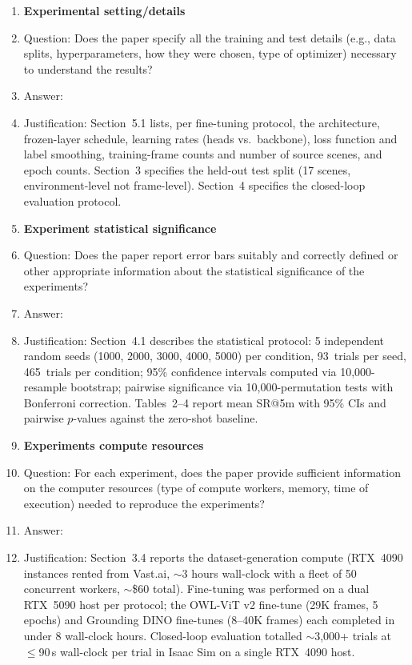 \begin{enumerate}
\item {\bf Experimental setting/details}
    \item[] Question: Does the paper specify all the training and test details (e.g., data splits, hyperparameters, how they were chosen, type of optimizer) necessary to understand the results?
    \item[] Answer: \answerYes{}
    \item[] Justification: Section~5.1 lists, per fine-tuning protocol, the architecture, frozen-layer schedule, learning rates (heads vs.\ backbone), loss function and label smoothing, training-frame counts and number of source scenes, and epoch counts. Section~3 specifies the held-out test split (17 scenes, environment-level not frame-level). Section~4 specifies the closed-loop evaluation protocol.
\item {\bf Experiment statistical significance}
    \item[] Question: Does the paper report error bars suitably and correctly defined or other appropriate information about the statistical significance of the experiments?
    \item[] Answer: \answerYes{}
    \item[] Justification: Section~4.1 describes the statistical protocol: 5 independent random seeds (1000, 2000, 3000, 4000, 5000) per condition, 93~trials per seed, 465~trials per condition; 95\% confidence intervals computed via 10{,}000-resample bootstrap; pairwise significance via 10{,}000-permutation tests with Bonferroni correction. Tables~2--4 report mean SR@5m with 95\% CIs and pairwise $p$-values against the zero-shot baseline.
\item {\bf Experiments compute resources}
    \item[] Question: For each experiment, does the paper provide sufficient information on the computer resources (type of compute workers, memory, time of execution) needed to reproduce the experiments?
    \item[] Answer: \answerYes{}
    \item[] Justification: Section~3.4 reports the dataset-generation compute (RTX~4090 instances rented from Vast.ai, $\sim$3 hours wall-clock with a fleet of 50 concurrent workers, $\sim$\$60 total). Fine-tuning was performed on a dual RTX~5090 host per protocol; the OWL-ViT v2 fine-tune (29K frames, 5 epochs) and Grounding DINO fine-tunes (8--40K frames) each completed in under 8 wall-clock hours. Closed-loop evaluation totalled $\sim$3{,}000+ trials at $\le$90\,s wall-clock per trial in Isaac Sim on a single RTX~4090 host.

\end{enumerate}
